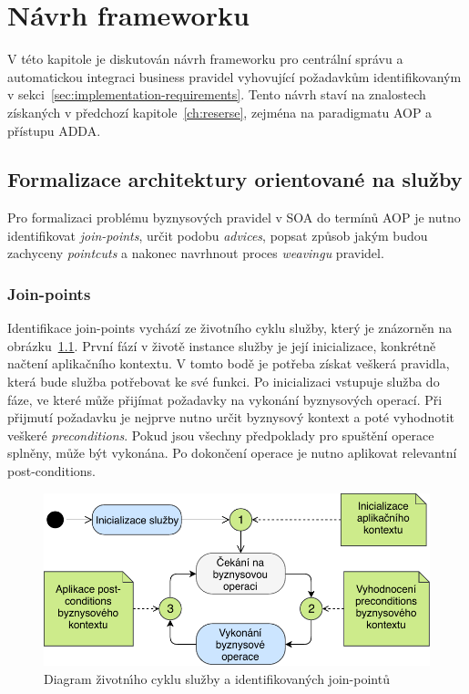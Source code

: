 
\chapter{Návrh frameworku}\label{ch:navrh}

V této kapitole je diskutován návrh frameworku pro centrální správu
a automatickou integraci business pravidel vyhovující požadavkům identifikovaným
v sekci~\ref{sec:implementation-requirements}. Tento návrh staví na znalostech získaných
v předchozí kapitole~\ref{ch:reserse}, zejména na paradigmatu \gls{AOP} a přístupu \gls{ADDA}.

\section{Formalizace architektury orientované na služby}

Pro formalizaci problému byznysových pravidel v \gls{SOA} do termínů \gls{AOP} je nutno
identifikovat \textit{join-points}, určit podobu \textit{advices}, popsat způsob jakým budou
zachyceny \textit{pointcuts} a nakonec navrhnout proces \textit{weavingu} pravidel.

\subsection{Join-points}

Identifikace join-points vychází ze životního cyklu služby, který je znázorněn
na obrázku~\ref{fig:join-points}. První fází v životě instance služby je její inicializace,
konkrétně načtení aplikačního kontextu. V tomto bodě je potřeba získat veškerá pravidla, která
bude služba potřebovat ke své funkci.
Po inicializaci vstupuje služba do fáze, ve které může přijímat požadavky
na vykonání byznysových operací. Při přijmutí požadavku je nejprve nutno určit
byznysový kontext a poté vyhodnotit veškeré \textit{preconditions}. Pokud jsou všechny předpoklady
pro spuštění operace splněny, může být vykonána. Po dokončení operace je nutno aplikovat relevantní
post-conditions.

\begin{figure}
    \centering
    \includegraphics[keepaspectratio=true, width=0.6\linewidth]{figures/join-points.pdf}
    \caption{Diagram životn\'{\i}ho cyklu služby a identifikovan\'ych join-pointů}
    \label{fig:join-points}
\end{figure}


